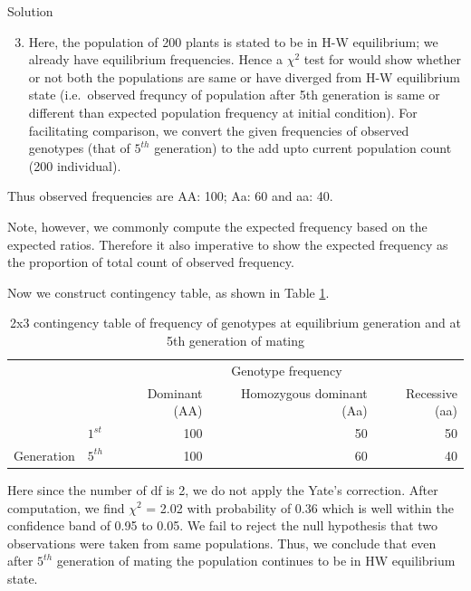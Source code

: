\documentclass[11pt,dvipsnames,ignorenonframetext,aspectratio=169]{beamer}
\providecommand{\tightlist}{%
  \setlength{\itemsep}{0pt}\setlength{\parskip}{0pt}}
\begin{document}
\begin{frame}{Solution}
\protect\hypertarget{solution}{}

\begin{enumerate}
\setcounter{enumi}{2}
\tightlist
\item
  Here, the population of 200 plants is stated to be in H-W equilibrium;
  we already have equilibrium frequencies. Hence a \(\chi^2\) test for
  would show whether or not both the populations are same or have
  diverged from H-W equilibrium state (i.e.~observed frequncy of
  population after 5th generation is same or different than expected
  population frequency at initial condition). For facilitating
  comparison, we convert the given frequencies of observed genotypes
  (that of \(5^{th}\) generation) to the add upto current population
  count (200 individual).
\end{enumerate}

\end{frame}

\begin{frame}{}
\protect\hypertarget{section-7}{}

Thus observed frequencies are AA: 100; Aa: 60 and aa: 40.

Note, however, we commonly compute the expected frequency based on the
expected ratios. Therefore it also imperative to show the expected
frequency as the proportion of total count of observed frequency.

Now we construct contingency table, as shown in Table
\ref{tab:hw-equilibrium-independence-chi}.

\begin{longtable}{llrrr}
\caption{\label{tab:hw-equilibrium-independence-chi}2x3 contingency table of frequency of genotypes at equilibrium generation and at 5th generation of mating}\\
\toprule
\multicolumn{2}{c}{  } & \multicolumn{3}{c}{Genotype frequency} \\
\cmidrule(l{3pt}r{3pt}){3-5}
  &   & Dominant (AA) & Homozygous dominant (Aa) & Recessive (aa)\\
\midrule
 & $1^{st}$ & 100 & 50 & 50\\
\cmidrule{2-5}
\multirow{-2}{*}{\raggedright\arraybackslash Generation} & $5^{th}$ & 100 & 60 & 40\\
\bottomrule
\end{longtable}

\end{frame}

\begin{frame}{}
\protect\hypertarget{section-8}{}

Here since the number of df is 2, we do not apply the Yate's correction.
After computation, we find \(\chi^2\) = 2.02 with probability of 0.36
which is well within the confidence band of 0.95 to 0.05. We fail to
reject the null hypothesis that two observations were taken from same
populations. Thus, we conclude that even after \(5^{th}\) generation of
mating the population continues to be in HW equilibrium state.

\end{frame}
\end{document}
